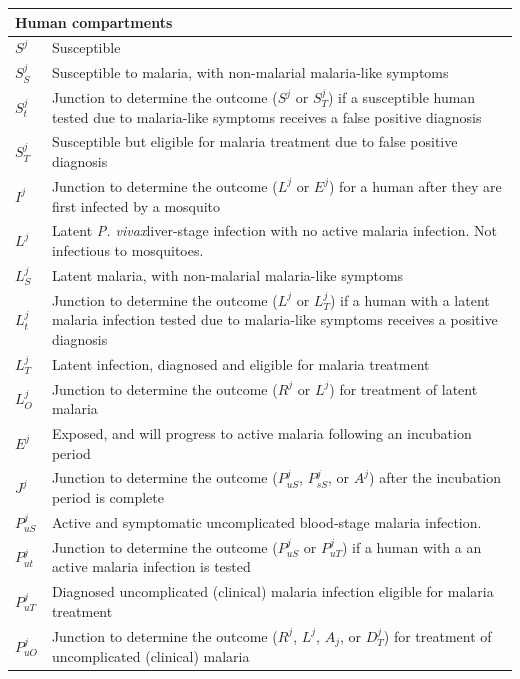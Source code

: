 \documentclass[doublespacing]{bmcart}
\newcommand{\pv}{\textit{P. vivax}}
\begin{document}
{\tiny
\begin{table}
\begin{center}
\begin{tabular}{p{}p{}}
\hline
\multicolumn{2}{l}{Human compartments} \\
\hline
$S^j$ & Susceptible \\
$S_S^j$ & Susceptible to malaria, with non-malarial malaria-like symptoms \\
$S_t^j$ & Junction to determine the outcome ($S^j$ or $S_T^j$) if a susceptible human tested due to malaria-like symptoms receives a false positive diagnosis \\
$S_T^j$ & Susceptible but eligible for malaria treatment due to false positive diagnosis \\

$I^j$ & Junction to determine the outcome ($L^j$ or $E^j$) for a human after they are first infected by a mosquito \\

$L^j$ & Latent \pv liver-stage infection with no active malaria infection. Not infectious to mosquitoes. \\
$L_S^j$ & Latent malaria, with non-malarial malaria-like symptoms \\
$L_t^j$ & Junction to determine the outcome ($L^j$ or $L_T^j$) if a human with a latent malaria infection tested due to malaria-like symptoms receives a positive diagnosis \\
$L_T^j$ & Latent infection, diagnosed and eligible for malaria treatment \\
$L_O^j$ & Junction to determine the outcome ($R^j$ or $L^j$) for treatment of latent malaria \\

$E^j$ & Exposed, and will progress to active malaria following an incubation period \\

$J^j$ & Junction to determine the outcome ($P_{uS}^j$, $P_{sS}^j$, or $A^j$) after the incubation period is complete \\

$P_{uS}^j$ & Active and symptomatic uncomplicated blood-stage malaria infection. \\
$P_{ut}^j$ & Junction to determine the outcome ($P_{uS}^j$ or $P_{uT}^j$) if a human with a an active malaria infection is tested \\
$P_{uT}^j$ & Diagnosed uncomplicated (clinical) malaria infection eligible for malaria treatment \\
$P_{uO}^j$ & Junction to determine the outcome ($R^j$, $L^j$, $A_j$, or $D_T^j$) for treatment of uncomplicated (clinical) malaria \\



\end{tabular}
\end{center}
\end{table}}
\end{document}
